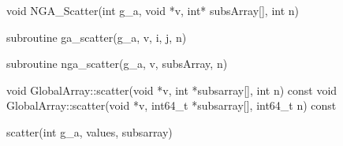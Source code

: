 \documentclass[12pt]{article}
\begin{document}

\begin{capi}
\begin{ccode}
void NGA_Scatter(int g_a, void *v, int* subsArray[], int n)
\end{ccode}
\begin{funcargs}
\end{funcargs}
\end{capi}

\begin{f2dapi}
\begin{fcode}
subroutine ga_scatter(g_a, v, i, j, n)
\end{fcode}
\begin{funcargs}
\end{funcargs}
\end{f2dapi}

\begin{fapi}
\begin{fcode}
subroutine nga_scatter(g_a, v, subsArray, n)
\end{fcode}
\begin{funcargs}
\end{funcargs}
\end{fapi}

\begin{cxxapi}
\begin{cxxcode}
void GlobalArray::scatter(void *v, int *subsarray[], int n) const
void GlobalArray::scatter(void *v, int64_t *subsarray[], int64_t n) const
\end{cxxcode}
\begin{funcargs}
\end{funcargs}
\end{cxxapi}

\begin{pyapi}
\begin{pycode}
scatter(int g_a, values, subsarray)
\end{pycode}
\end{pyapi}
\ncoll
\end{document}
